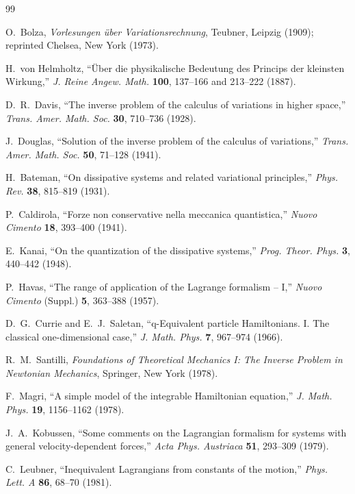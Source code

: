 \documentclass[11pt]{article}
\theoremstyle{remark}
\begin{document}
\begin{thebibliography}{99}

 O.~Bolza, \emph{Vorlesungen \"uber Variationsrechnung}, Teubner, Leipzig (1909); reprinted Chelsea, New York (1973).

 H.~von Helmholtz, ``\"Uber die physikalische Bedeutung des Princips der kleinsten Wirkung,'' \emph{J. Reine Angew. Math.} \textbf{100}, 137--166 and 213--222 (1887).

 D.~R.~Davis, ``The inverse problem of the calculus of variations in higher space,'' \emph{Trans. Amer. Math. Soc.} \textbf{30}, 710--736 (1928).

 J.~Douglas, ``Solution of the inverse problem of the calculus of variations,'' \emph{Trans. Amer. Math. Soc.} \textbf{50}, 71--128 (1941).

 H.~Bateman, ``On dissipative systems and related variational principles,'' \emph{Phys. Rev.} \textbf{38}, 815--819 (1931).

 P.~Caldirola, ``Forze non conservative nella meccanica quantistica,'' \emph{Nuovo Cimento} \textbf{18}, 393--400 (1941).

 E.~Kanai, ``On the quantization of the dissipative systems,'' \emph{Prog. Theor. Phys.} \textbf{3}, 440--442 (1948).

 P.~Havas, ``The range of application of the Lagrange formalism -- I,'' \emph{Nuovo Cimento} (Suppl.) \textbf{5}, 363--388 (1957).

 D.~G.~Currie and E.~J.~Saletan, ``q-Equivalent particle Hamiltonians. I. The classical one-dimensional case,'' \emph{J. Math. Phys.} \textbf{7}, 967--974 (1966).

 R.~M.~Santilli, \emph{Foundations of Theoretical Mechanics I: The Inverse Problem in Newtonian Mechanics}, Springer, New York (1978).

 F.~Magri, ``A simple model of the integrable Hamiltonian equation,'' \emph{J. Math. Phys.} \textbf{19}, 1156--1162 (1978).

 J.~A.~Kobussen, ``Some comments on the Lagrangian formalism for systems with general velocity-dependent forces,'' \emph{Acta Phys. Austriaca} \textbf{51}, 293--309 (1979).

 C.~Leubner, ``Inequivalent Lagrangians from constants of the motion,'' \emph{Phys. Lett. A} \textbf{86}, 68--70 (1981).


\end{thebibliography}
\end{document}
